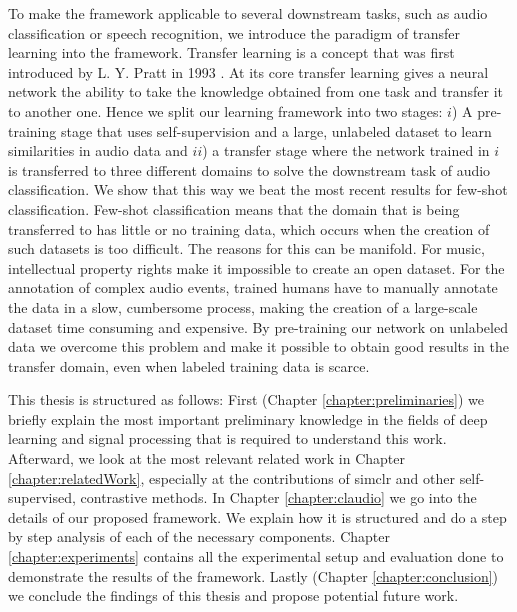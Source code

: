To make the framework applicable to several downstream tasks, such as audio classification or speech recognition, we introduce the paradigm of transfer learning into the framework. Transfer learning is a concept that was first introduced by L. Y. Pratt in 1993 \cite{NIPS1992_641}. At its core transfer learning gives a neural network the ability to take the knowledge obtained from one task and transfer it to another one. Hence we split our learning framework into two stages: $i$) A pre-training stage that uses self-supervision and a large, unlabeled dataset to learn similarities in audio data and $ii$) a transfer stage where the network trained in $i$ is transferred to three different domains to solve the downstream task of audio classification. We show that this way we beat the most recent results for few-shot classification. Few-shot classification means that the domain that is being transferred to has little or no training data, which occurs when the creation of such datasets is too difficult. The reasons for this can be manifold. For music, intellectual property rights make it impossible to create an open dataset. For the annotation of complex audio events, trained humans have to manually annotate the data in a slow, cumbersome process, making the creation of a large-scale dataset time consuming and expensive. By pre-training our network on unlabeled data we overcome this problem and make it possible to obtain good results in the transfer domain, even when labeled training data is scarce.

This thesis is structured as follows: First (Chapter \ref{chapter:preliminaries}) we briefly explain the most important preliminary knowledge in the fields of deep learning and signal processing that is required to understand this work. Afterward, we look at the most relevant related work in Chapter \ref{chapter:relatedWork}, especially at the contributions of \gls{simclr} and other self-supervised, contrastive methods. In Chapter \ref{chapter:claudio} we go into the details of our proposed framework. We explain how it is structured and do a step by step analysis of each of the necessary components. Chapter \ref{chapter:experiments} contains all the experimental setup and evaluation done to demonstrate the results of the framework. Lastly (Chapter \ref{chapter:conclusion}) we conclude the findings of this thesis and propose potential future work.

